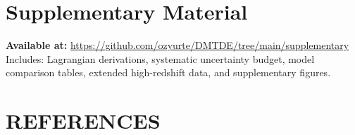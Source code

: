 \documentclass[aps,prd,twocolumn,superscriptaddress,nofootinbib,floatfix,preprintnumbers]{revtex4-2}
\begin{document}
\section*{Supplementary Material}
\textbf{Available at:} \url{https://github.com/ozyurte/DMTDE/tree/main/supplementary} \\
Includes: Lagrangian derivations, systematic uncertainty budget, model comparison tables, extended high-redshift data, and supplementary figures.

\newpage
\onecolumngrid
\vspace*{-2\baselineskip}
{\centering\section*{REFERENCES}\par}
\twocolumngrid
\end{document}
